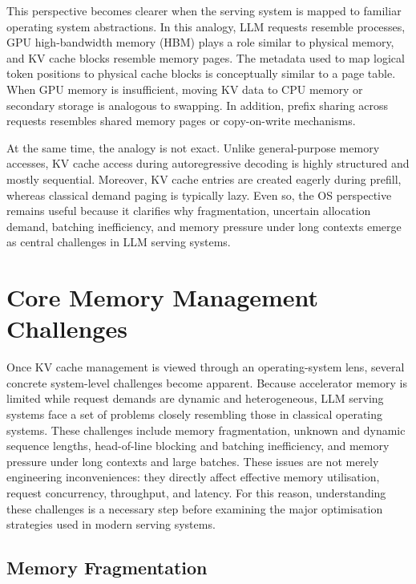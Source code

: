 \documentclass[10pt, a4paper]{article}
\begin{document}
    This perspective becomes clearer when the serving system is mapped to familiar
    operating system abstractions. In this analogy, LLM requests resemble
    processes, GPU high-bandwidth memory (HBM) plays a role similar to physical
    memory, and KV cache blocks resemble memory pages. The metadata used to map
    logical token positions to physical cache blocks is conceptually similar to a
    page table. When GPU memory is insufficient, moving KV data to CPU memory or
    secondary storage is analogous to swapping. In addition, prefix sharing across
    requests resembles shared memory pages or copy-on-write mechanisms.

    At the same time, the analogy is not exact. Unlike general-purpose memory
    accesses, KV cache access during autoregressive decoding is highly structured
    and mostly sequential. Moreover, KV cache entries are created eagerly during
    prefill, whereas classical demand paging is typically lazy. Even so, the OS perspective remains useful because it clarifies why
    fragmentation, uncertain allocation demand, batching inefficiency, and memory
    pressure under long contexts emerge as central challenges in LLM serving
    systems.

\section{Core Memory Management Challenges}
\label{sec:challenges}

Once KV cache management is viewed through an operating-system lens, several concrete system-level challenges become apparent. Because accelerator memory is limited while request demands are dynamic and heterogeneous, LLM serving systems face a set of problems closely resembling those in classical operating systems. These challenges include memory fragmentation, unknown and dynamic sequence lengths, head-of-line blocking and batching inefficiency, and memory pressure under long contexts and large batches. These issues are not merely engineering inconveniences: they directly affect effective memory utilisation, request concurrency, throughput, and latency. For this reason, understanding these challenges is a necessary step before examining the major optimisation strategies used in modern serving systems.

\subsection{Memory Fragmentation}
\end{document}
